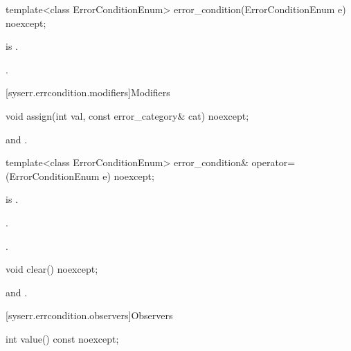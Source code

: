 %
\begin{itemdecl}
template<class ErrorConditionEnum>
  error_condition(ErrorConditionEnum e) noexcept;
\end{itemdecl}

\begin{itemdescr}
\pnum
\constraints
{} is .

\pnum
\ensures
{}.
\end{itemdescr}


[syserr.errcondition.modifiers]{Modifiers}

%
\begin{itemdecl}
void assign(int val, const error_category& cat) noexcept;
\end{itemdecl}

\begin{itemdescr}
\pnum
\ensures
{} and .
\end{itemdescr}

%
\begin{itemdecl}
template<class ErrorConditionEnum>
  error_condition& operator=(ErrorConditionEnum e) noexcept;
\end{itemdecl}

\begin{itemdescr}
\pnum
\constraints
{} is .

\pnum
\ensures
{}.

\pnum
\returns
{}.
\end{itemdescr}

%
\begin{itemdecl}
void clear() noexcept;
\end{itemdecl}

\begin{itemdescr}
\pnum
\ensures
{} and .
\end{itemdescr}

[syserr.errcondition.observers]{Observers}

%
\begin{itemdecl}
int value() const noexcept;
\end{itemdecl}

